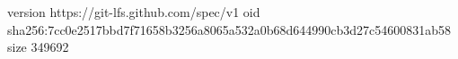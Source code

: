 version https://git-lfs.github.com/spec/v1
oid sha256:7cc0e2517bbd7f71658b3256a8065a532a0b68d644990cb3d27c54600831ab58
size 349692
